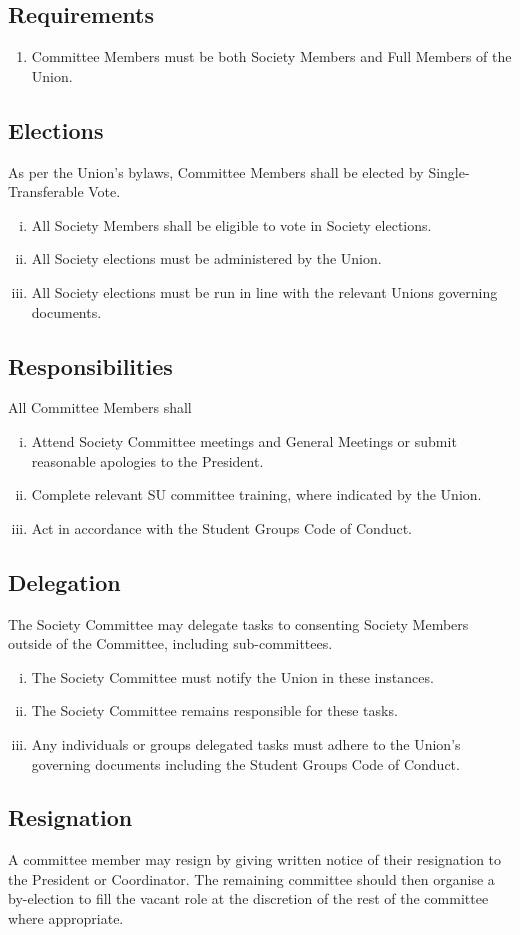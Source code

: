 \subsection{Requirements}
\begin{enumerate}
    \item Committee Members must be both Society Members and Full Members of the Union.
\end{enumerate}

\subsection{Elections}
As per the Union's bylaws, Committee Members shall be elected by Single-Transferable Vote.
\begin{enumerate}[i.]
    \item All Society Members shall be eligible to vote in Society elections.
    \item All Society elections must be administered by the Union.
    \item All Society elections must be run in line with the relevant Unions governing documents.
\end{enumerate}

\subsection{Responsibilities}
All Committee Members shall
\begin{enumerate}[i.]
    \item Attend Society Committee meetings and General Meetings or submit reasonable apologies to the President.
    \item Complete relevant SU committee training, where indicated by the Union.
    \item Act in accordance with the Student Groups Code of Conduct.
\end{enumerate}

\subsection{Delegation}
The Society Committee may delegate tasks to consenting Society Members outside of the Committee, including sub-committees.
\begin{enumerate}[i.]
    \item The Society Committee must notify the Union in these instances.
    \item The Society Committee remains responsible for these tasks.
    \item Any individuals or groups delegated tasks must adhere to the Union’s governing documents including the Student Groups Code of Conduct.
\end{enumerate}

\subsection{Resignation}
A committee member may resign by giving written notice of their resignation to the President or Coordinator. The remaining committee should then organise a by-election to fill the vacant role at the discretion of the rest of the committee where appropriate.
